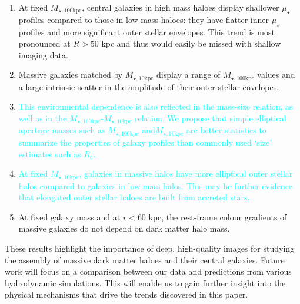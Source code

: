 \documentclass[a4paper,fleqn,usenatbib]{mnras}
\def\minn{{$M_{\star,10\mathrm{kpc}}$}}
\def\mtot{{$M_{\star,100\mathrm{kpc}}$}}
\def\mden{{$\mu_{\star}$}}
\newcommand{\song}[1]{\textcolor{cyan}{#1}}
\begin{document}
    \begin{enumerate}
    
    \item At fixed \mtot{}, central galaxies in high mass haloes 
            display shallower \mden{} profiles compared to those in low mass haloes: they have flatter inner \mden{} profiles and 
            more significant outer stellar envelopes.  This trend is most pronounced at $R>50$ kpc and thus would easily be missed with shallow imaging data.                 
                                
        \item Massive galaxies matched by \minn{} display a range of  \mtot{} values and a large intrinsic scatter in the amplitude of their outer stellar envelopes. 
              
            
        
        \item \song{This environmental dependence is also reflected in the mass-size relation, as well as in the \mtot{}-\minn{} relation. We propose that simple elliptical aperture masses such as \mtot{} and\minn{} are better statistics to summarize the properties of galaxy profiles than commonly used `size' estimates such as $R_e$.}
      
      \item \song{At fixed \minn{}, galaxies in massive halos have more elliptical outer stellar halos compared to galaxies in low mass halos. This may be further evidence that elongated outer stellar haloes are built from accreted stars.}
                     
        \item At fixed galaxy mass and at $r<60$ kpc, the rest-frame colour gradients of massive galaxies do not depend on dark matter halo mass. 
             
    \end{enumerate}
    
    These results highlight the importance of deep, high-quality images for studying 
    the assembly of massive dark matter haloes and their central galaxies. Future work will focus on a comparison between our data and  predictions from various hydrodynamic simulations. This will enable us to gain further insight into the physical mechanisms that drive the trends discovered in this paper.
\end{document}

